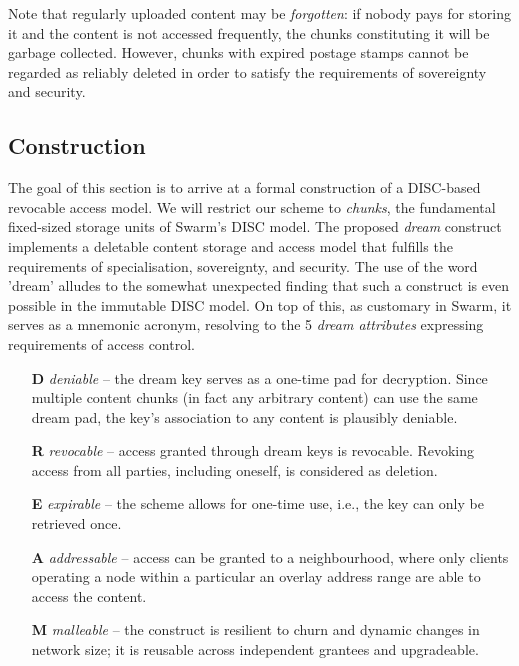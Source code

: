 Note that regularly uploaded content may be \emph{forgotten}: if nobody pays for storing it and the content is not accessed frequently, the chunks constituting it will be garbage collected. However, chunks with  expired postage stamps cannot be regarded as reliably deleted in order to satisfy the requirements of sovereignty and security. 


\subsection{Construction}

The goal of this section is to arrive at a formal construction of a DISC-based revocable access model. We will restrict our scheme to \emph{chunks}, the fundamental fixed-sized storage units of Swarm's DISC model.  The proposed \emph{dream} construct implements a  deletable content storage and access model that fulfills the requirements of specialisation, sovereignty, and security. The use of the word 'dream' alludes to the somewhat unexpected finding that such a construct is even possible in the immutable DISC model. On top of this, as customary in Swarm, it serves as a mnemonic acronym, resolving to the 5 \emph{dream attributes} expressing requirements of access control.

\begin{itemize}
    \item[\textbf{D}] \emph{deniable} -- the dream key serves as a one-time pad for decryption. Since multiple content chunks (in fact any arbitrary content) can use the same dream pad, the key's association to any content is plausibly deniable.
    \item[\textbf{R}] \emph{revocable} -- access granted through  dream keys is revocable. Revoking access from all parties, including oneself, is considered as deletion.   
    \item[\textbf{E}] \emph{expirable} -- the scheme allows for one-time use, i.e., the key can only be retrieved once.
    \item[\textbf{A}] \emph{addressable} -- access can be granted to a neighbourhood, where only clients operating a node within a particular an overlay address range are able to access the content.
    \item[\textbf{M}] \emph{malleable}  --  the construct is resilient to churn and dynamic changes in network size; it is reusable across independent grantees and upgradeable.
\end{itemize}

